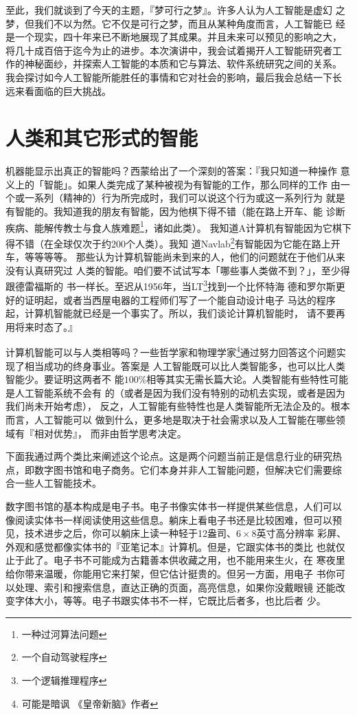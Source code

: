 \documentclass[12pt,a4paper]{article}
\begin{document}
至此，我们就谈到了今天的主题，『梦可行之梦』。许多人认为人工智能是虚幻
之梦，但我们不以为然。它不仅是可行之梦，而且从某种角度而言，人工智能已
经是一个现实，四十年来已不断地展现了其成果。并且未来可以预见的影响之大，
将几十成百倍于迄今为止的进步。本次演讲中，我会试着揭开人工智能研究者工
作的神秘面纱，并探索人工智能的本质和它与算法、软件系统研究之间的关系。
我会探讨如今人工智能所能胜任的事情和它对社会的影响，最后我会总结一下长
远来看面临的巨大挑战。

\section{人类和其它形式的智能}

机器能显示出真正的智能吗？西蒙给出了一个深刻的答案：『我只知道一种操作
意义上的「智能」。如果人类完成了某种被视为有智能的工作，那么同样的工作
由一个或一系列（精神的）行为所完成时，我们可以说这个行为或这一系列行为
就是有智能的。我知道我的朋友有智能，因为他棋下得不错（能在路上开车、能
诊断疾病、能解传教士与食人族难题\footnote{一种过河算法问题}，诸如此类）。
我知道A计算机有智能因为它棋下得不错（在全球仅次于约200个人类）。我知
道Navlab\footnote{一个自动驾驶程序}有智能因为它能在路上开车，等等等等。
那些认为计算机智能尚未到来的人，他们的问题就在于他们从来没有认真研究过
人类的智能。咱们要不试试写本「哪些事人类做不到？」，至少得跟德雷福斯的
书一样长。至迟从1956年，当LT\footnote{一个逻辑推理程序}找到一个比怀特海
德和罗尔斯更好的证明起，或者当西屋电器的工程师们写了一个能自动设计电子
马达的程序起，计算机智能就已经是一个事实了。所以，我们谈论计算机智能时，
请不要再用将来时态了。』

计算机智能可以与人类相等吗？一些哲学家和物理学家\footnote{可能是暗讽
  《皇帝新脑》作者}通过努力回答这个问题实现了相当成功的终身事业。答案是
人工智能既可以比人类智能多，也可以比人类智能少。要证明这两者不
能$100\%$相等其实无需长篇大论。人类智能有些特性可能是人工智能系统不会有
的（或者是因为我们没有特别的动机去实现，或者是因为我们尚未开始考虑），
反之，人工智能有些特性也是人类智能所无法企及的。根本而言，人工智能可以
做到什么，更多地是取决于社会需求以及人工智能在哪些领域有『相对优势』，
而非由哲学思考决定。

下面我通过两个类比来阐述这个论点。这是两个问题当前正是信息行业的研究热
点，即数字图书馆和电子商务。它们本身并非人工智能问题，但解决它们需要综
合一些人工智能技术。

数字图书馆的基本构成是电子书。电子书像实体书一样提供某些信息，人们可以
像阅读实体书一样阅读使用这些信息。躺床上看电子书还是比较困难，但可以预
见，技术进步之后，你可以躺床上读一种轻于12盎司、$6\times8$英寸高分辨率
彩屏、外观和感觉都像实体书的『亚笔记本』计算机。但是，它跟实体书的类比
也就仅止于此了。电子书不可能成为古籍善本供收藏之用，也不能用来生火，在
寒夜里给你带来温暖，你能用它来打架，但它估计挺贵的。但另一方面，用电子
书你可以处理、索引和搜索信息，直达正确的页面，高亮信息，如果你没戴眼镜
还能改变字体大小，等等。电子书跟实体书不一样，它既比后者多，也比后者
少。
\end{document}
